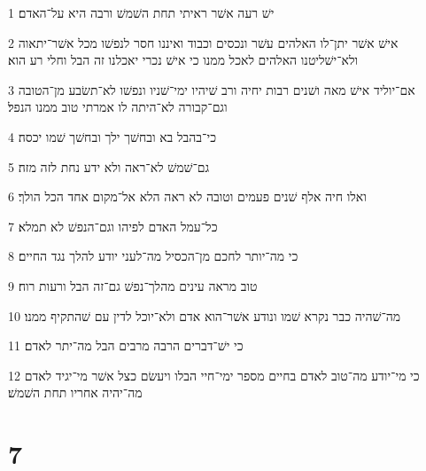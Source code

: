 \par 1 ישׁ רעה אשׁר ראיתי תחת השׁמשׁ ורבה היא על־האדם׃
\par 2 אישׁ אשׁר יתן־לו האלהים עשׁר ונכסים וכבוד ואיננו חסר לנפשׁו מכל אשׁר־יתאוה ולא־ישׁליטנו האלהים לאכל ממנו כי אישׁ נכרי יאכלנו זה הבל וחלי רע הוא׃
\par 3 אם־יוליד אישׁ מאה ושׁנים רבות יחיה ורב שׁיהיו ימי־שׁניו ונפשׁו לא־תשׂבע מן־הטובה וגם־קבורה לא־היתה לו אמרתי טוב ממנו הנפל׃
\par 4 כי־בהבל בא ובחשׁך ילך ובחשׁך שׁמו יכסה׃
\par 5 גם־שׁמשׁ לא־ראה ולא ידע נחת לזה מזה׃
\par 6 ואלו חיה אלף שׁנים פעמים וטובה לא ראה הלא אל־מקום אחד הכל הולך׃
\par 7 כל־עמל האדם לפיהו וגם־הנפשׁ לא תמלא׃
\par 8 כי מה־יותר לחכם מן־הכסיל מה־לעני יודע להלך נגד החיים׃
\par 9 טוב מראה עינים מהלך־נפשׁ גם־זה הבל ורעות רוח׃
\par 10 מה־שׁהיה כבר נקרא שׁמו ונודע אשׁר־הוא אדם ולא־יוכל לדין עם שׁהתקיף ממנו׃
\par 11 כי ישׁ־דברים הרבה מרבים הבל מה־יתר לאדם׃
\par 12 כי מי־יודע מה־טוב לאדם בחיים מספר ימי־חיי הבלו ויעשׂם כצל אשׁר מי־יגיד לאדם מה־יהיה אחריו תחת השׁמשׁ׃

\chapter{7}

